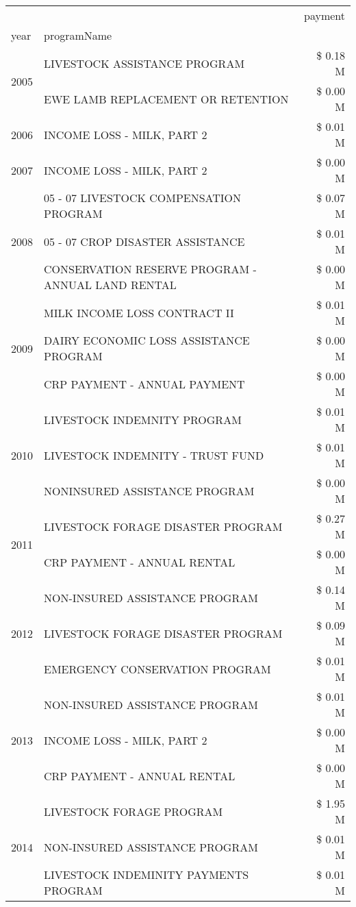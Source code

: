 \begin{tabular}{llr}
\toprule
 &  & payment \\
year & programName &  \\
\midrule
\multirow[t]{2}{*}{2005} & LIVESTOCK ASSISTANCE PROGRAM & \$ 0.18 M \\
 & EWE LAMB REPLACEMENT OR RETENTION & \$ 0.00 M \\
\cline{1-3}
2006 & INCOME LOSS - MILK, PART 2 & \$ 0.01 M \\
\cline{1-3}
2007 & INCOME LOSS - MILK, PART 2 & \$ 0.00 M \\
\cline{1-3}
\multirow[t]{3}{*}{2008} & 05 - 07 LIVESTOCK COMPENSATION PROGRAM & \$ 0.07 M \\
 & 05 - 07 CROP DISASTER ASSISTANCE & \$ 0.01 M \\
 & CONSERVATION RESERVE PROGRAM - ANNUAL LAND RENTAL & \$ 0.00 M \\
\cline{1-3}
\multirow[t]{3}{*}{2009} & MILK INCOME LOSS CONTRACT II & \$ 0.01 M \\
 & DAIRY ECONOMIC LOSS ASSISTANCE PROGRAM & \$ 0.00 M \\
 & CRP PAYMENT - ANNUAL PAYMENT & \$ 0.00 M \\
\cline{1-3}
\multirow[t]{3}{*}{2010} & LIVESTOCK INDEMNITY PROGRAM & \$ 0.01 M \\
 & LIVESTOCK INDEMNITY - TRUST FUND & \$ 0.01 M \\
 & NONINSURED ASSISTANCE PROGRAM & \$ 0.00 M \\
\cline{1-3}
\multirow[t]{2}{*}{2011} & LIVESTOCK FORAGE DISASTER PROGRAM & \$ 0.27 M \\
 & CRP PAYMENT - ANNUAL RENTAL & \$ 0.00 M \\
\cline{1-3}
\multirow[t]{3}{*}{2012} & NON-INSURED ASSISTANCE PROGRAM & \$ 0.14 M \\
 & LIVESTOCK FORAGE DISASTER PROGRAM & \$ 0.09 M \\
 & EMERGENCY CONSERVATION PROGRAM & \$ 0.01 M \\
\cline{1-3}
\multirow[t]{3}{*}{2013} & NON-INSURED ASSISTANCE PROGRAM & \$ 0.01 M \\
 & INCOME LOSS - MILK, PART 2 & \$ 0.00 M \\
 & CRP PAYMENT - ANNUAL RENTAL & \$ 0.00 M \\
\cline{1-3}
\multirow[t]{3}{*}{2014} & LIVESTOCK FORAGE PROGRAM & \$ 1.95 M \\
 & NON-INSURED ASSISTANCE PROGRAM & \$ 0.01 M \\
 & LIVESTOCK INDEMINITY PAYMENTS PROGRAM & \$ 0.01 M \\

\end{tabular}
